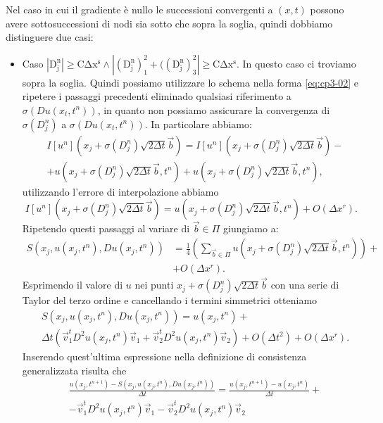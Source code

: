 Nel caso in cui il gradiente è nullo le successioni convergenti a $(x,t)$ possono avere sottosuccessioni di nodi sia sotto che sopra la soglia, quindi dobbiamo distinguere due casi:
\begin{itemize}
  \item \textsf{Caso} $\mathrm{|D_j^n|\ge C\Delta x^s\land|(D_j^n)_1^2+((D_j^n)_3^2|\ge C\Delta x^s}$. In questo caso ci troviamo sopra la soglia. Quindi possiamo utilizzare lo schema nella forma \eqref{eq:cp3-02} e ripetere i passaggi precedenti eliminado qualsiasi riferimento a $\sigma(Du(x_t,t^n))$, in quanto non possiamo assicurare la convergenza di $\sigma(D_j^n)$ a $\sigma(Du(x_t,t^n))$. In particolare abbiamo:
\[
  \begin{split}
    & I[u^n](x_j+\sigma(D_j^n)\sqrt{2\Delta t}\vec{b}) = I[u^n](x_j+\sigma(D_j^n)\sqrt{2\Delta t}\vec{b}) - \\
    & +u(x_j+\sigma(D_j^n)\sqrt{2\Delta t}\vec{b},t^n) + u(x_j+\sigma(D_j^n)\sqrt{2\Delta t}\vec{b},t^n),
  \end{split}
\]
utilizzando l'errore di interpolazione abbiamo
\[
I[u^n](x_j+\sigma(D_j^n)\sqrt{2\Delta t}\vec{b})=u(x_j+\sigma(D_j^n)\sqrt{2\Delta t}\vec{b},t^n) + O(\Delta x^r).
\]
Ripetendo questi passaggi al variare di $\vec{b}\in\Pi$ giungiamo a:
\[
 \begin{split}
 S(x_j,u(x_j,t^n),Du(x_j,t^n))&=\frac{1}{4}\left(\sum_{\vec{b}\in\Pi}u(x_j+\sigma(D_j^n)\sqrt{2\Delta t}\vec{b},t^n)\right)+\\
  &+ O(\Delta x^r).
 \end{split}
\]
Esprimendo il valore di $u$ nei punti $x_j+\sigma(D_j^n)\sqrt{2\Delta t}\vec{b}$ con una serie di Taylor del terzo ordine e cancellando i termini simmetrici otteniamo
\begin{equation}
  \label{eq:cp3-11}
  \begin{split}
    &S(x_j,u(x_j,t^n),Du(x_j,t^n)) = u(x_j,t^n) + \\
    &\Delta t\left(\vec{v}_1^tD^2u(x_j,t^n)\vec{v}_1 + \vec{v}_2^tD^2u(x_j,t^n)\vec{v}_2\right) + O(\Delta t^2) + O(\Delta x^r).
   \end{split}
\end{equation}
Inserendo quest'ultima espressione nella definizione di consistenza generalizzata risulta che
\[
\begin{split}
  &\frac{u(x_j,t^{n+1})-S(x_j,u(x_j,t^n),Du(x_j,t^n))}{\Delta t}= \frac{u(x_j,t^{n+1})-u(x_j,t^n)}{\Delta t} + \\
  &  -\vec{v}_1^tD^2u(x_j,t^n)\vec{v}_1 -\vec{v}_2^tD^2u(x_j,t^n)\vec{v}_2  

\end{split}\]
\end{itemize}
